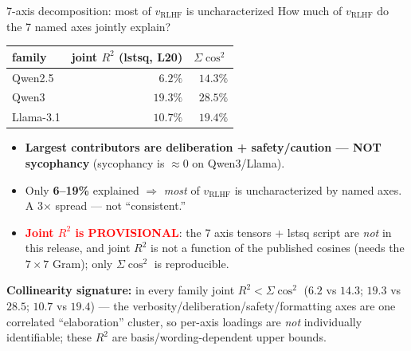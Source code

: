 \documentclass[aspectratio=169,11pt]{beamer}
\begin{document}
\begin{frame}{7-axis decomposition: most of $v_{\mathrm{RLHF}}$ is uncharacterized}
  How much of $v_{\mathrm{RLHF}}$ do the 7 named axes jointly explain?

  \vspace{0.3em}
  \begin{table}
    \centering
    \footnotesize
    \begin{tabular}{@{}lrr@{}}
      \toprule
      family & joint $R^2$ (lstsq, L20) & $\Sigma\cos^2$ \\
      \midrule
      Qwen2.5   & $6.2\%$  & $14.3\%$ \\
      Qwen3     & $19.3\%$ & $28.5\%$ \\
      Llama-3.1 & $10.7\%$ & $19.4\%$ \\
      \bottomrule
    \end{tabular}
  \end{table}

  \vspace{0.3em}
  \begin{itemize}
    \item \textbf{Largest contributors are deliberation + safety/caution --- NOT
      sycophancy} (sycophancy is $\approx 0$ on Qwen3/Llama).
    \item Only \textbf{6--19\%} explained $\Rightarrow$ \emph{most} of $v_{\mathrm{RLHF}}$
      is uncharacterized by named axes. A 3$\times$ spread --- not ``consistent.''
    \item \textcolor{red}{\textbf{Joint $R^2$ is PROVISIONAL}}: the 7 axis tensors +
      lstsq script are \emph{not} in this release, and joint $R^2$ is not a function of
      the published cosines (needs the $7\!\times\!7$ Gram); only $\Sigma\cos^2$ is reproducible.
  \end{itemize}

  \vspace{0.2em}
  \scriptsize
  \textbf{Collinearity signature:} in every family joint $R^2 < \Sigma\cos^2$
  ($6.2$ vs $14.3$; $19.3$ vs $28.5$; $10.7$ vs $19.4$) --- the
  verbosity/deliberation/safety/formatting axes are one correlated ``elaboration''
  cluster, so per-axis loadings are \emph{not} individually identifiable; these
  $R^2$ are basis/wording-dependent upper bounds.
\end{frame}

\end{document}
